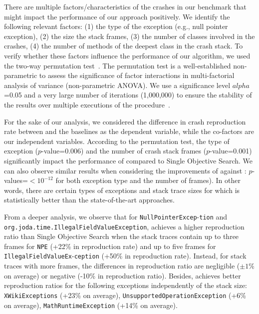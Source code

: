 There are multiple factors/characteristics of the crashes in our benchmark that might impact the performance of our approach positively. We identify the following relevant factors: (1) the type of the exception (e.g., null pointer exception), (2) the size the stack frames, (3) the number of classes involved in the crashes, (4) the number of methods of the deepest class in the crash stack. To verify whether these factors influence the performance of our algorithm, we used the two-way permutation test~\cite{pesarin2010permutation}. The permutation test is a well-established non-parametric to assess the significance of factor interactions in multi-factorial analysis of variance (non-parametric ANOVA). We use a significance level $alpha$=0.05 and a very large number of iterations (1,000,000) to ensure the stability of the results over multiple executions of the procedure~\cite{pesarin2010permutation}. 

For the sake of our analysis, we considered the difference in crash reproduction rate between \moho and the baselines as the dependent variable, while the co-factors are our independent variables. According to the permutation test, the type of exception ($p$-value=0.006) and the number of crash stack frames ($p$-value=0.001) significantly impact the performance of \moho compared to Single Objective Search. We can also observe similar results when considering the improvements of \moho against \decomposition: $p$-values=$<10^{-12}$ for both exception type and the number of frames). In other words, there are certain types of exceptions and stack trace sizes for which \moho is statistically better than the state-of-the-art approaches.

From a deeper analysis, we observe that for \texttt{NullPointerExcep}-\texttt{tion} and \texttt{org.joda.tim\-e.IllegalFieldValueException}, \moho achieves a higher reproduction ratio than Single Objective Search when the stack traces contain up to three frames for \texttt{NPE} (+22\% in reproduction rate) and up to five frames for \texttt{IllegalFieldValueEx}-\texttt{ception} (+50\% in reproduction rate). Instead, for stack traces with more frames, the differences in reproduction ratio are negligible ($\pm 1\%$ on average) or negative (-10\% in reproduction ratio). Besides, \moho achieves better reproduction ratios for the following exceptions independently of the stack size: \texttt{XWikiExceptions} (+23\% on average), \texttt{UnsupportedOperationException} (+6\% on average), \texttt{MathRuntimeException} (+14\% on average).


